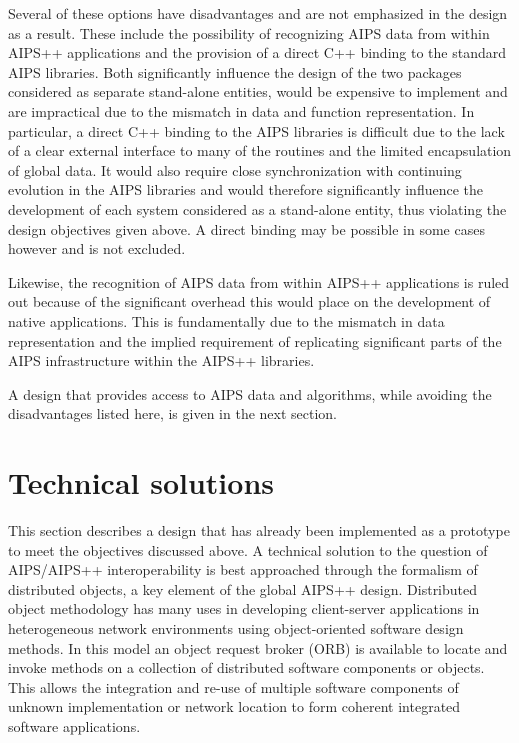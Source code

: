  Several of these options have disadvantages and are
not emphasized in the design as a result. These include the possibility of
recognizing AIPS data from within AIPS++ applications and the
provision of a direct C++ binding to the standard AIPS libraries. Both
significantly influence the design of the two packages considered as
separate stand-alone entities, would be expensive to implement and are
impractical due to the mismatch in data and function representation.
In particular, a direct C++ binding to the AIPS libraries is difficult
due to the lack of a clear external interface to many of the routines
and the limited encapsulation of global data. It would also require
close synchronization with continuing evolution in the AIPS libraries
and would therefore significantly influence the development of each
system considered as a stand-alone entity, thus violating the design
objectives given above. A direct binding may be possible in some cases
however and is not excluded.

 Likewise, the recognition of AIPS data from within AIPS++
applications is ruled out because of the significant overhead this
would place on the development of native applications. This is
fundamentally due to the mismatch in data representation and the
implied requirement of replicating significant parts of the AIPS
infrastructure within the AIPS++ libraries.

 A design that provides access to AIPS data and algorithms, while
avoiding the disadvantages listed here, is given in the next section.

\section{Technical solutions}

 This section describes a design that has already been implemented as a
prototype to meet the objectives discussed above. A technical solution
to the question of AIPS/AIPS++ interoperability is best approached
through the formalism of distributed objects, a key element of the
global AIPS++ design. Distributed object methodology has many uses in
developing client-server applications in heterogeneous network
environments using object-oriented software design methods. In this
model an object request broker (ORB) is available to locate and invoke
methods on a collection of distributed software components or
objects. This allows the integration and re-use of multiple software
components of unknown implementation or network location to form
coherent integrated software applications.

